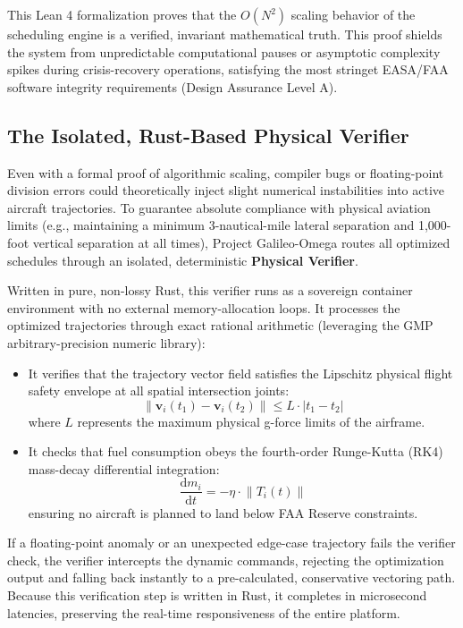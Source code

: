 \documentclass[11pt,a4paper]{book}
\begin{document}
This Lean 4 formalization proves that the $O(N^2)$ scaling behavior of the scheduling engine is a verified, invariant mathematical truth. This proof shields the system from unpredictable computational pauses or asymptotic complexity spikes during crisis-recovery operations, satisfying the most stringet EASA/FAA software integrity requirements (Design Assurance Level A).

\subsection{The Isolated, Rust-Based Physical Verifier}\label{subsec:physical_verifier}

Even with a formal proof of algorithmic scaling, compiler bugs or floating-point division errors could theoretically inject slight numerical instabilities into active aircraft trajectories. To guarantee absolute compliance with physical aviation limits (e.g., maintaining a minimum 3-nautical-mile lateral separation and 1,000-foot vertical separation at all times), Project Galileo-Omega routes all optimized schedules through an isolated, deterministic \textbf{Physical Verifier}.

Written in pure, non-lossy Rust, this verifier runs as a sovereign container environment with no external memory-allocation loops. It processes the optimized trajectories through exact rational arithmetic (leveraging the GMP arbitrary-precision numeric library):
\begin{itemize}
    \item It verifies that the trajectory vector field satisfies the Lipschitz physical flight safety envelope at all spatial intersection joints:
    \begin{equation}
    \label{eq:lipschitz_condition}
    \lVert \mathbf{v}_i(t_1) - \mathbf{v}_i(t_2) \rVert \le L \cdot |t_1 - t_2|
    \end{equation}
    where $L$ represents the maximum physical g-force limits of the airframe.
    \item It checks that fuel consumption obeys the fourth-order Runge-Kutta (RK4) mass-decay differential integration:
    \begin{equation}
    \label{eq:fuel_burn_ode}
    \frac{\mathrm{d}m_i}{\mathrm{d}t} = -\eta \cdot \lVert T_i(t) \rVert
    \end{equation}
    ensuring no aircraft is planned to land below FAA Reserve constraints.
\end{itemize}

If a floating-point anomaly or an unexpected edge-case trajectory fails the verifier check, the verifier intercepts the dynamic commands, rejecting the optimization output and falling back instantly to a pre-calculated, conservative vectoring path. Because this verification step is written in Rust, it completes in microsecond latencies, preserving the real-time responsiveness of the entire platform.
\end{document}
